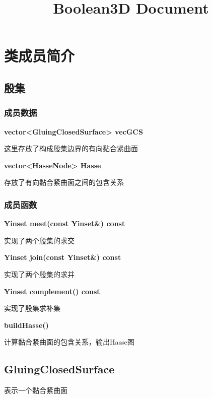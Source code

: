\documentclass[a4paper]{book}
\makeatletter
\newcommand{\voidenvironment}[1]{%
\expandafter\providecommand\csname env@#1@save@env\endcsname{}%
\expandafter\providecommand\csname env@#1@process\endcsname{}%
\@ifundefined{#1}{}{\RenewEnviron{#1}{}}%
}
\numberwithin{equation}{chapter}
\theoremstyle{definition}
\makeatother
\begin{document}
\pagestyle{empty}




\setcounter{chapter}{0}




\title{Boolean3D Document}

\chapter{类成员简介}
\section{殷集}
\subsection{成员数据}
\textbf{vector<GluingClosedSurface> vecGCS}

这里存放了构成殷集边界的有向黏合紧曲面

\textbf{vector<HasseNode> Hasse}

存放了有向黏合紧曲面之间的包含关系
\subsection{成员函数}
\textbf{Yinset meet(const Yinset\&) const}

实现了两个殷集的求交

\textbf{Yinset join(const Yinset\&) const}

实现了两个殷集的求并

\textbf{Yinset complement() const}

实现了殷集求补集

\textbf{buildHasse()}

计算黏合紧曲面的包含关系，输出Hasse图


\section{GluingClosedSurface}
表示一个黏合紧曲面
\end{document}
